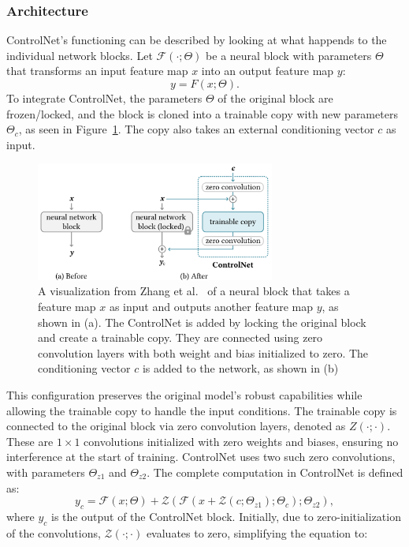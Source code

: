 \subsubsection{Architecture}
ControlNet's functioning can be described by looking at what happends to the individual network blocks. Let $\mathcal{F}(\cdot; \Theta)$ be a neural block with parameters $\Theta$ that transforms an input feature map $x$ into an output feature map $y$:
\[
y = F(x; \Theta).
\]
\noindent
To integrate ControlNet, the parameters $\Theta$ of the original block are frozen/locked, and the block is cloned into a trainable copy with new parameters $\Theta_c$, as seen in Figure~\ref{fig:control_net:network_blocks}. The copy also takes an external conditioning vector $c$ as input.
\begin{figure}[h!]
    \centering
    \includegraphics[width=0.7\textwidth]{assets/control_net_network_blocks.pdf}
    \caption{A visualization from Zhang et al.~\cite{zhang2023addingconditionalcontroltexttoimage} of a neural block that takes a feature map $x$ as input and outputs another feature map $y$, as shown in (a). The ControlNet is added by locking the original block and create a trainable copy. They are connected using zero convolution layers with both weight and bias initialized to zero. The conditioning vector $c$ is added to the network, as shown in (b)}
    \label{fig:control_net:network_blocks}
\end{figure}
This configuration preserves the original model's robust capabilities while allowing the trainable copy to handle the input conditions. The trainable copy is connected to the original block via zero convolution layers, denoted as $Z(\cdot; \cdot)$. These are $1 \times 1$ convolutions initialized with zero weights and biases, ensuring no interference at the start of training. ControlNet uses two such zero convolutions, with parameters $\Theta_{z1}$ and $\Theta_{z2}$. The complete computation in ControlNet is defined as:
\[
y_c = \mathcal{F}(x; \Theta) + \mathcal{Z}(\mathcal{F}(x + \mathcal{Z}(c; \Theta_{z1}); \Theta_c); \Theta_{z2}),
\]
where $y_c$ is the output of the ControlNet block. Initially, due to zero-initialization of the convolutions, $\mathcal{Z}(\cdot; \cdot)$ evaluates to zero, simplifying the equation to:
